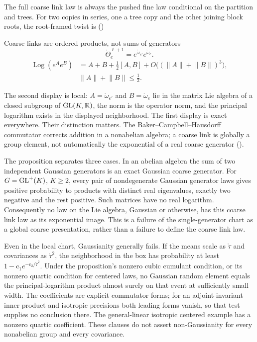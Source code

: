 The full coarse link law is always the pushed fine law conditional on the partition and trees.
For two copies in series, one a tree copy and the other joining block roots, the root-framed twist is
()
\begin{keyequation}{Coarse links are ordered products, not sums of generators}
\[
\mathring\Theta^{\ell+1}_e
=e^{\mathring\omega_{e'}}e^{\mathring\omega_e}.
\]
\[
\begin{aligned}
\operatorname{Log}(e^Ae^B)
&=A+B+\tfrac12[A,B]+O\bigl((\lVert A\rVert+\lVert B\rVert)^3\bigr),\\
&\lVert A\rVert+\lVert B\rVert\le\tfrac12.
\end{aligned}
\]
\end{keyequation}
The second display is local: $A=\mathring\omega_{e'}$ and $B=\mathring\omega_e$ lie in the
matrix Lie algebra of a closed subgroup of $\mathrm{GL}(K,\mathbb R)$, the norm is the operator norm, and the
principal logarithm exists in the displayed neighborhood. The first display is exact everywhere.
Their distinction matters. The Baker--Campbell--Hausdorff commutator corrects addition in a
nonabelian algebra; a coarse link is globally a group element, not automatically the exponential
of a real coarse generator ().

The proposition separates three cases. In an abelian algebra the sum of two independent Gaussian
generators is an exact Gaussian coarse generator. For $G=\mathrm{GL}^+(K)$, $K\ge2$, every pair of
nondegenerate Gaussian generator laws gives positive probability to products with distinct real
eigenvalues, exactly two negative and the rest positive. Such matrices have no real logarithm.
Consequently no law on the Lie algebra, Gaussian or otherwise, has this coarse link law as its
exponential image. This is a failure of the single-generator chart as a global coarse
presentation, rather than a failure to define the coarse link law.

Even in the local chart, Gaussianity generally fails. If the means scale as $\mathring\tau$ and
covariances as $\mathring\tau^2$, the neighborhood in the box has probability at least
$1-\mathrm c_1e^{-\mathrm c_2/\mathring\tau^2}$. Under the proposition's nonzero cubic cumulant
condition, or its nonzero quartic condition for centered laws, no Gaussian random element equals
the principal-logarithm product almost surely on that event at sufficiently small width.
The coefficients are explicit commutator forms; for an adjoint-invariant inner product and
isotropic precisions both leading forms vanish, so that test supplies no conclusion there.
The general-linear isotropic centered example has a nonzero quartic coefficient. These clauses
do not assert non-Gaussianity for every nonabelian group and every covariance.

